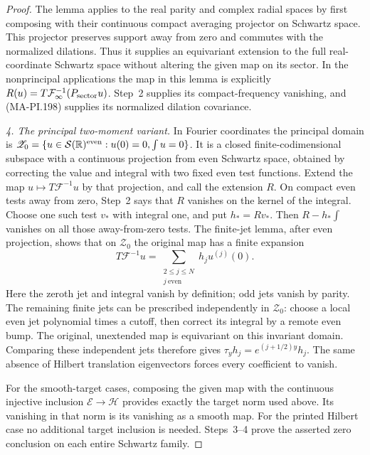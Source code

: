 \begin{proof}
The lemma applies to the real parity and complex radial
spaces by first composing with their continuous compact
averaging projector on Schwartz space.  This projector
preserves support away from zero and commutes with the
normalized dilations.  Thus it supplies an equivariant
extension to the full real-coordinate Schwartz space
without altering the given map on its sector.
In the nonprincipal applications the map in this lemma is
explicitly $R(u)=T\mathcal F_\infty^{-1}(P_{\rm sector}u)$.
Step~2 supplies its compact-frequency vanishing, and
(MA-PI.198) supplies its normalized dilation covariance.

\emph{4. The principal two-moment variant.}
In Fourier coordinates the principal domain is
$\mathscr Z_0=\{u\in\mathcal S(\mathbb R)^{\rm even}:
u(0)=0,\int u=0\}$.
It is a closed finite-codimensional subspace with a
continuous projection from even Schwartz space,
obtained by correcting the value and integral with
two fixed even test functions.  Extend the map
$u\mapsto T\mathcal F^{-1}u$ by that projection,
and call the extension $R$.
On compact even tests away from zero, Step~2 says
that $R$ vanishes on the kernel of the integral.
Choose one such test $v_*$ with integral one, and put
$h_*=Rv_*$.  Then $R-h_*\int$ vanishes on all those
away-from-zero tests.  The finite-jet lemma, after even
projection, shows that on $\mathscr Z_0$ the original
map has a finite expansion
\[
       T\mathcal F^{-1}u=\sum_{\substack{2\le j\le N\\j\ \text{even}}}
                                     h_j u^{(j)}(0).
 \tag{MA-PI.205}
\]
Here the zeroth jet and integral vanish by definition;
odd jets vanish by parity.  The remaining finite jets
can be prescribed independently in $\mathscr Z_0$:
choose a local even jet polynomial times a cutoff,
then correct its integral by a remote even bump.
The original, unextended map is equivariant on this
invariant domain.  Comparing these independent jets
therefore gives $\tau_yh_j=e^{(j+1/2)y}h_j$.
The same absence of Hilbert translation eigenvectors
forces every coefficient to vanish.

For the smooth-target cases, composing the given map
with the continuous injective inclusion
$\mathcal E\to\mathscr H$ provides exactly the target
norm used above.  Its vanishing in that norm is its
vanishing as a smooth map.  For the printed Hilbert
case no additional target inclusion is needed.
Steps~3--4 prove the asserted zero conclusion on each
entire Schwartz family.
\end{proof}

